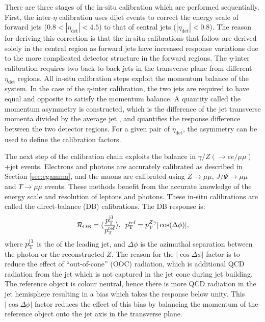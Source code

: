 There are three stages of the in-situ calibration which are performed sequentially. First, the inter-$\eta$ calibration uses dijet events to correct the energy scale of forward jets ($0.8 < |\eta_{\text{det}}| < 4.5$) to that of central jets ($|\eta_{\text{det}}|<0.8$). The reason for deriving this correction is that the in-situ calibrations that follow are derived solely in the central region as forward jets have increased response variations due to the more complicated detector structure in the forward regions. The $\eta$-inter calibration requires two back-to-back jets in the transverse plane from different $\eta_{\text{det}}$ regions. All in-situ calibration steps exploit the momentum balance of the system. In the case of the $\eta$-inter calibration, the two jets are required to have equal and opposite \pt to satisfy the momentum balance. A quantity called the momentum asymmetry is constructed, which is the difference of the jet transverse momenta divided by the average jet \pt, and quantifies the response difference between the two detector regions. For a given pair of $\eta_{\text{det}}$, the asymmetry can be used to define the calibration factors.

The next step of the calibration chain exploits the \pt balance in $\gamma/Z(\rightarrow ee/\mu\mu)$+jet events. Electrons and photons are accurately calibrated as described in Section \ref{sec:egamma}, and the muons are calibrated using $Z\rightarrow\mu\mu$, $J/\Psi\rightarrow\mu\mu$ and $\Upsilon\rightarrow\mu\mu$ events. These methods benefit from the accurate knowledge of the energy scale and resolution of leptons and photons. These in-situ calibrations are called the direct-balance (DB) calibrations. The DB response is:
\begin{equation}
    \mathcal{R}_{\text{DB}}=\langle\frac{p_{\text{T}}^{\text{j1}}}{p_{\text{T}}^{\text{ref}}}\rangle,\hspace{5pt}p_{\text{T}}^{\text{ref}}=p_{\text{T}}^{Z\gamma}|\cos(\Delta\phi)|,
\end{equation}
where $p_{\text{T}}^{\text{j1}}$ is the \pt of the leading jet, and $\Delta\phi$ is the azimuthal separation between the photon or the reconstructed $Z$. The reason for the $|\cos\Delta\phi|$ factor is to reduce the effect of ``out-of-cone'' (OOC) radiation, which is additional QCD radiation from the jet which is not captured in the jet cone during jet building. The reference object is colour neutral, hence there is more QCD radiation in the jet hemisphere resulting in a bias which takes the response below unity. This $|\cos\Delta\phi|$ factor reduces the effect of this bias by balancing the momentum of the reference object onto the jet axis in the transverse plane. 


